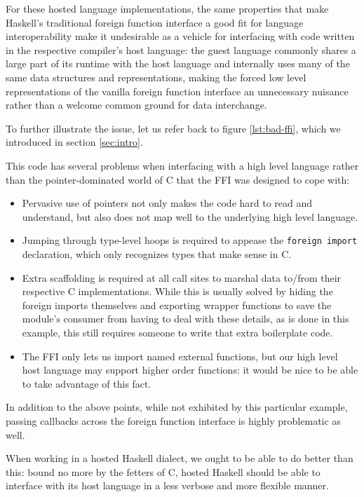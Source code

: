 \documentclass{sigplanconf}
\begin{document}
For these hosted language implementations, the same properties that make
Haskell's traditional foreign function interface a good fit for language
interoperability make it undesirable as a vehicle for interfacing with
code written in the respective compiler's host language: the guest language
commonly shares a large part of its runtime with the host language and
internally uses many of the same data structures and representations, making
the forced low level representations of the vanilla foreign function interface
an unnecessary nuisance rather than a welcome common ground for data
interchange.

To further illustrate the issue, let us refer back to figure \ref{lst:bad-ffi},
which we introduced in section \ref{sec:intro}.

This code has several problems when interfacing with a high level language
rather than the pointer-dominated world of C that the FFI was designed to
cope with:

\begin{itemize}
\item
  Pervasive use of pointers not only makes the code hard to read and
  understand, but also does not map well to the underlying high level
  language.
\item
  Jumping through type-level hoops is required to appease the
  \lstinline!foreign import! declaration, which only recognizes types that
  make sense in C.
\item
  Extra scaffolding is required at all call sites to marshal data to/from
  their respective C implementations. While this is usually solved
  by hiding the foreign imports themselves and exporting wrapper functions to
  save the module's consumer from having to deal with these details, as is done
  in this example, this still requires someone to write that extra
  boilerplate code.
\item
  The FFI only lets us import named external functions, but our high level
  host language may support higher order functions: it would be nice to be able
  to take advantage of this fact.
\end{itemize}

In addition to the above points, while not exhibited by this particular
example, passing callbacks across the foreign function interface is highly
problematic as well.

When working in a hosted Haskell dialect, we ought to be able to do better
than this: bound no more by the fetters of C, hosted Haskell should be able
to interface with its host language in a less verbose and more flexible manner.
\end{document}
